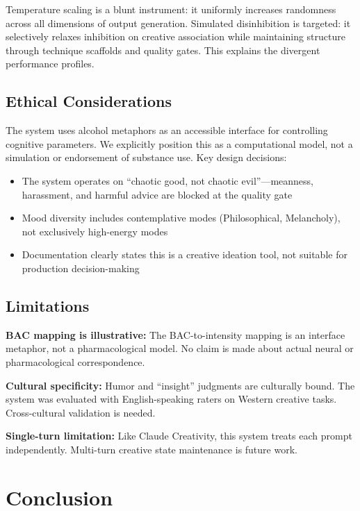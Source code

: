 \documentclass[11pt,a4paper]{article}
\begin{document}
Temperature scaling is a blunt instrument: it uniformly increases randomness across all dimensions of output generation. Simulated disinhibition is targeted: it selectively relaxes inhibition on creative association while maintaining structure through technique scaffolds and quality gates. This explains the divergent performance profiles.

\subsection{Ethical Considerations}

The system uses alcohol metaphors as an accessible interface for controlling cognitive parameters. We explicitly position this as a computational model, not a simulation or endorsement of substance use. Key design decisions:

\begin{itemize}
    \item The system operates on ``chaotic good, not chaotic evil''---meanness, harassment, and harmful advice are blocked at the quality gate
    \item Mood diversity includes contemplative modes (Philosophical, Melancholy), not exclusively high-energy modes
    \item Documentation clearly states this is a creative ideation tool, not suitable for production decision-making
\end{itemize}

\subsection{Limitations}

\textbf{BAC mapping is illustrative:} The BAC-to-intensity mapping is an interface metaphor, not a pharmacological model. No claim is made about actual neural or pharmacological correspondence.

\textbf{Cultural specificity:} Humor and ``insight'' judgments are culturally bound. The system was evaluated with English-speaking raters on Western creative tasks. Cross-cultural validation is needed.

\textbf{Single-turn limitation:} Like Claude Creativity, this system treats each prompt independently. Multi-turn creative state maintenance is future work.

\section{Conclusion}
\end{document}
